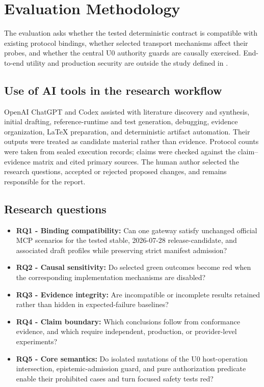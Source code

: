 \section{Evaluation Methodology}
\label{sec:evaluation}

The evaluation asks whether the tested deterministic contract is compatible with existing protocol bindings, whether selected transport mechanisms affect their probes, and whether the central U0 authority guards are causally exercised. End-to-end utility and production security are outside the study defined in .

\subsection{Use of AI tools in the research workflow}
OpenAI ChatGPT and Codex assisted with literature discovery and synthesis, initial drafting, reference-runtime and test generation, debugging, evidence organization, \LaTeX{} preparation, and deterministic artifact automation. Their outputs were treated as candidate material rather than evidence. Protocol counts were taken from sealed execution records; claims were checked against the claim--evidence matrix and cited primary sources. The human author selected the research questions, accepted or rejected proposed changes, and remains responsible for the report.

\subsection{Research questions}
\begin{itemize}
  \item \textbf{RQ1 - Binding compatibility:} Can one gateway satisfy unchanged official MCP scenarios for the tested stable, 2026-07-28 release-candidate, and associated draft profiles while preserving strict manifest admission?
  \item \textbf{RQ2 - Causal sensitivity:} Do selected green outcomes become red when the corresponding implementation mechanisms are disabled?
  \item \textbf{RQ3 - Evidence integrity:} Are incompatible or incomplete results retained rather than hidden in expected-failure baselines?
  \item \textbf{RQ4 - Claim boundary:} Which conclusions follow from conformance evidence, and which require independent, production, or provider-level experiments?
  \item \textbf{RQ5 - Core semantics:} Do isolated mutations of the U0 host-operation intersection, epistemic-admission guard, and pure authorization predicate enable their prohibited cases and turn focused safety tests red?
\end{itemize}

